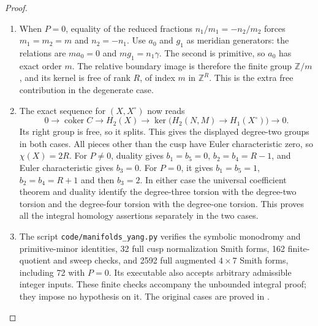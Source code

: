 \begin{proof}
\begin{enumerate}[label=\arabic*.,leftmargin=*]
\item When $P=0$, equality of the reduced fractions
$n_1/m_1=-n_2/m_2$ forces $m_1=m_2=m$ and $n_2=-n_1$.
Use $a_0$ and $g_1$ as meridian generators: the relations are
$ma_0=0$ and $mg_1=n_1\gamma$. The second is primitive,
so $a_0$ has exact order $m$. The relative boundary image is
therefore the finite group $\mathbb Z/m$, and its kernel is
free of rank $R$, of index $m$ in $\mathbb Z^R$.
This is the extra free contribution in the degenerate case.

\item The exact sequence for $(X,X^\circ)$ now reads
\[
 0\longrightarrow\operatorname{coker}C
 \longrightarrow H_2(X)
 \longrightarrow\ker\bigl(H_2(N,M)\to H_1(X^\circ)\bigr)
 \longrightarrow0.
\]
Its right group is free, so it splits. This gives the displayed
degree-two groups in both cases. All pieces other than the cusp
have Euler characteristic zero, so $\chi(X)=2R$.
For $P\ne0$, duality gives $b_1=b_5=0$, $b_2=b_4=R-1$,
and Euler characteristic gives $b_3=0$.
For $P=0$, it gives $b_1=b_5=1$, $b_2=b_4=R+1$ and then
$b_3=2$. In either case the universal coefficient theorem and
duality identify the degree-three torsion with the degree-two
torsion and the degree-four torsion with the degree-one torsion.
This proves all the integral homology assertions separately
in the two cases.

\item The script \texttt{code/manifolds\_yang.py} verifies the symbolic
monodromy and primitive-minor identities, 32 full cusp
normalization Smith forms, 162 finite-quotient and sweep
checks, and 2592 full augmented $4\times7$ Smith forms,
including 72 with $P=0$. Its executable also accepts arbitrary
admissible integer inputs. These finite checks accompany the
unbounded integral proof; they impose no hypothesis on it.
The original cases are proved in \cite[Theorem~7.13]{manYang26}.
\end{enumerate}
\end{proof}

